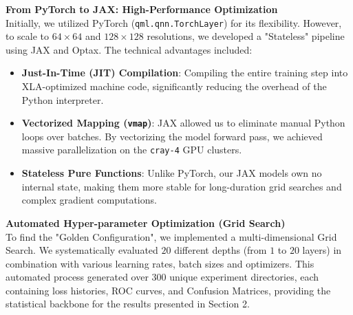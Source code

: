 \documentclass{oqireport}
\begin{document}
{\large \textbf{From PyTorch to JAX: High-Performance Optimization}} \\
Initially, we utilized PyTorch (\texttt{qml.qnn.TorchLayer}) for its flexibility. However, to scale to $64 \times 64$ and $128 \times 128$ resolutions, we developed a "Stateless" pipeline using JAX and Optax. The technical advantages included:
\begin{itemize}
    \item \textbf{Just-In-Time (JIT) Compilation}: Compiling the entire training step into XLA-optimized machine code, significantly reducing the overhead of the Python interpreter.
    \item \textbf{Vectorized Mapping (\texttt{vmap})}: JAX allowed us to eliminate manual Python loops over batches. By vectorizing the model forward pass, we achieved massive parallelization on the \texttt{cray-4} GPU clusters.
    \item \textbf{Stateless Pure Functions}: Unlike PyTorch, our JAX models own no internal state, making them more stable for long-duration grid searches and complex gradient computations.
\end{itemize}

{\large \textbf{Automated Hyper-parameter Optimization (Grid Search)}} \\
To find the "Golden Configuration", we implemented a multi-dimensional Grid Search. We systematically evaluated $20$ different depths (from $1$ to $20$ layers) in combination with various learning rates, batch sizes and optimizers. This automated process generated over 300 unique experiment directories, each containing loss histories, ROC curves, and Confusion Matrices, providing the statistical backbone for the results presented in Section 2. \\
\end{document}

